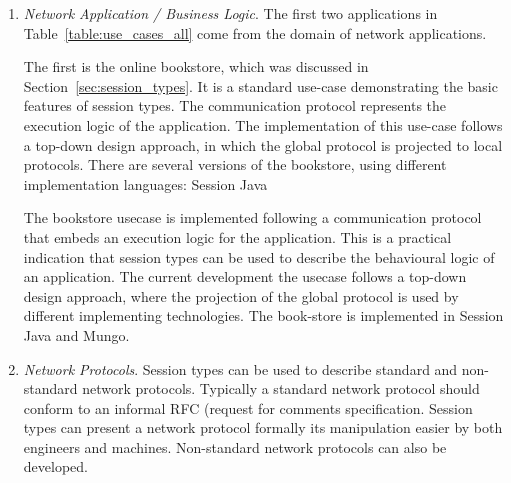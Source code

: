 \begin{enumerate}
	\item	\emph{Network Application / Business Logic}.
			The first two applications in Table~\ref{table:use_cases_all}
			come from the domain of network applications.

			The first is the online bookstore,
			which was discussed
			in Section~\ref{sec:session_types}. It is a standard use-case demonstrating
			the basic features of session types. The communication protocol represents the execution logic of the application. The implementation of this use-case follows a top-down design approach, in which the global protocol is projected to local protocols. There are several versions of the bookstore, using different implementation languages: Session Java 

			The bookstore usecase is implemented following a
			communication protocol that embeds an execution logic
			for the application. This is a practical indication
			that session types can be used to describe the
			behavioural logic of an application.
			The current development the usecase follows a
			top-down design approach, where the projection
			of the global protocol is used by different
			implementing technologies.
			The book-store is implemented in Session Java and Mungo.


		


	
	\item	{\em Network Protocols}.
	Session types can be used to describe standard and non-standard network protocols.
	Typically a standard network protocol should conform to
	an informal RFC (request for comments specification. Session types
	can present a network protocol formally its manipulation easier
	by both engineers and machines.
	Non-standard network protocols can also be developed.


\end{enumerate}
